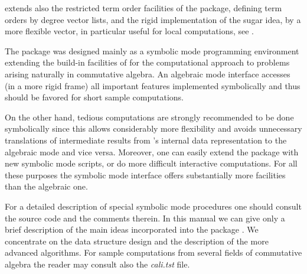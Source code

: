  extends also the restricted term order facilities of the
 package, defining term orders by degree vector lists, and
the rigid implementation of the sugar idea, by a more flexible
 vector, in particular useful for local computations, see
\cite{Graebe:94}.
\medskip

The package was designed mainly as a symbolic mode programming
environment extending the build-in facilities of \REDUCE for the
computational approach to problems arising naturally in commutative
algebra. An algebraic mode interface accesses (in a more rigid frame)
all important features implemented symbolically and thus
should be favored for short sample computations.

On the other hand, tedious computations are strongly recommended to
be done symbolically since this allows considerably more flexibility
and avoids unnecessary translations of intermediate results from
's internal data representation to the algebraic mode and vice
versa. Moreover, one can easily extend the package with new symbolic
mode scripts, or do more difficult interactive computations. For all
these purposes the symbolic mode interface offers substantially more
facilities than the algebraic one.
\medskip

For a detailed description of special symbolic mode procedures one
should consult the source code and the comments therein. In this
manual we can give only a brief description of the main ideas
incorporated into the package . We concentrate on the data
structure design and the description of the more advanced algorithms.
For sample computations from several fields of commutative algebra
the reader may consult also the \emph{cali.tst} file.
\medskip

